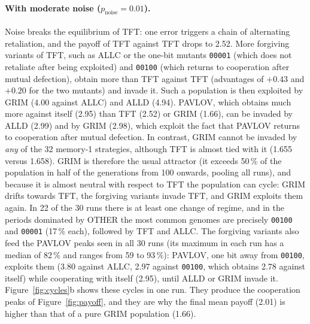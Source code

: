 \documentclass[10pt,a4paper]{article}
\newcommand{\pn}{p_{\text{noise}}}
\newcommand{\g}[1]{\texttt{#1}}   %
\begin{document}
\paragraph{With moderate noise ($\pn=0.01$).} Noise breaks the equilibrium of TFT: one error triggers a
chain of alternating retaliation, and the payoff of TFT against TFT drops to 2.52. More forgiving variants
of TFT, such as ALLC or the one-bit mutants \g{00001} (which does not retaliate after being exploited) and
\g{00100} (which returns to cooperation after mutual defection), obtain more than TFT against TFT
(advantages of $+0.43$ and $+0.20$ for the two mutants) and invade it. Such a population is then exploited
by GRIM (4.00 against ALLC) and ALLD (4.94). PAVLOV, which obtains much more against itself (2.95) than TFT
(2.52) or GRIM (1.66), can be invaded by ALLD (2.99) and by GRIM (2.98), which exploit the fact that PAVLOV
returns to cooperation after mutual defection. In contrast, GRIM cannot be invaded by \emph{any} of the 32
memory-1 strategies, although TFT is almost tied with it (1.655 versus 1.658). GRIM is therefore the usual
attractor (it exceeds 50\,\% of the population in half of the generations from 100 onwards, pooling all runs), and because it is almost neutral with respect to TFT the
population can cycle: GRIM drifts towards TFT, the forgiving variants invade TFT, and GRIM exploits them again. In 22
of the 30 runs there is at least one change of regime, and in the periods dominated by OTHER the most
common genomes are precisely \g{00100} and \g{00001} (17\,\% each), followed by TFT and ALLC.
The forgiving variants also feed the PAVLOV peaks seen in all 30 runs (its maximum in each run has a median of 82\,\% and ranges from 59 to 93\,\%): PAVLOV,
one bit away from \g{00100}, exploits them (3.80 against ALLC, 2.97 against \g{00100}, which obtains 2.78
against itself) while cooperating with itself (2.95), until ALLD or GRIM invade it.
Figure~\ref{fig:cycles}b shows these cycles in one run. They produce the cooperation peaks of
Figure~\ref{fig:payoff}, and they are why the final mean payoff (2.01) is higher than that of a pure GRIM
population (1.66).
\end{document}
